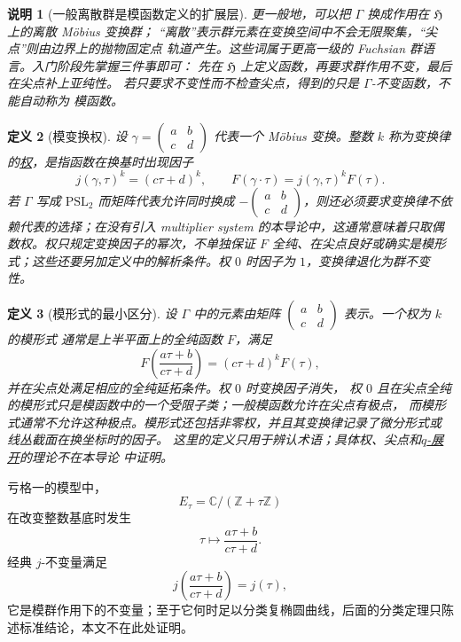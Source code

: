 \documentclass[UTF8,fontset=none,a4paper,11pt]{ctexart}
\theoremstyle{foundation-definition}
\newtheorem{definition}{定义}[section]
\theoremstyle{foundation-theorem}
\theoremstyle{foundation-proposition}
\theoremstyle{foundation-example}
\theoremstyle{foundation-remark}
\newtheorem{remark}[definition]{说明}
\theoremstyle{foundation-theorem}
\newcommand{\C}{\mathbb C}
\newcommand{\Z}{\mathbb Z}
\newcommand{\term}[2]{\hyperref[#1]{#2}}
\begin{document}
\begin{remark}[一般离散群是模函数定义的扩展层]
更一般地，可以把 \(\Gamma\) 换成作用在 \(\mathfrak H\) 上的离散 Möbius 变换群；
“离散”表示群元素在变换空间中不会无限聚集，“尖点”则由边界上的抛物固定点
轨道产生。这些词属于更高一级的 Fuchsian 群语言。入门阶段先掌握三件事即可：
先在 \(\mathfrak H\) 上定义函数，再要求群作用不变，最后在尖点补上亚纯性。
若只要求不变性而不检查尖点，得到的只是 \(\Gamma\)-不变函数，不能自动称为
模函数。
\end{remark}

\begin{definition}[模变换权]\label{def:modular-weight}
设 \(\gamma=\begin{pmatrix}a&b\\c&d\end{pmatrix}\) 代表一个 Möbius 变换。整数 \(k\) 称为变换律的\term{def:modular-weight}{权}，是指函数在换基时出现因子
\[
j(\gamma,\tau)^k=(c\tau+d)^k,
\qquad
F(\gamma\cdot\tau)=j(\gamma,\tau)^kF(\tau).
\]
若 \(\Gamma\) 写成 \(\mathrm{PSL}_2\) 而矩阵代表允许同时换成 \(-\begin{pmatrix}a&b\\c&d\end{pmatrix}\)，则还必须要求变换律不依赖代表的选择；在没有引入 multiplier system 的本导论中，这通常意味着只取偶数权。权只规定变换因子的幂次，不单独保证 \(F\) 全纯、在尖点良好或确实是模形式；这些还要另加定义中的解析条件。权 \(0\) 时因子为 \(1\)，变换律退化为群不变性。
\end{definition}

\begin{definition}[模形式的最小区分]\label{def:modular-form}
设 \(\Gamma\) 中的元素由矩阵
\(\begin{pmatrix}a&b\\c&d\end{pmatrix}\) 表示。一个权为 \(k\) 的模形式
通常是上半平面上的全纯函数 \(F\)，满足
\[
F\!\left(\frac{a\tau+b}{c\tau+d}\right)
=(c\tau+d)^kF(\tau),
\]
并在尖点处满足相应的全纯延拓条件。权 \(0\) 时变换因子消失，
权 \(0\) 且在尖点全纯的模形式只是模函数中的一个受限子类；一般模函数允许在尖点有极点，
而模形式通常不允许这种极点。模形式还包括非零权，并且其变换律记录了微分形式或
线丛截面在换坐标时的因子。
这里的定义只用于辨认术语；具体权、尖点和\term{def:q-expansion}{\(q\)-展开}的理论不在本导论
中证明。
\end{definition}

亏格一的模型中，
\[
E_\tau=\C/(\Z+\tau\Z)
\]
在改变整数基底时发生
\[
\tau\longmapsto\frac{a\tau+b}{c\tau+d}.
\]
经典 \(j\)-不变量满足
\[
j\left(\frac{a\tau+b}{c\tau+d}\right)=j(\tau),
\]
它是模群作用下的不变量；至于它何时足以分类复椭圆曲线，后面的分类定理只陈述标准结论，本文不在此处证明。
\end{document}
